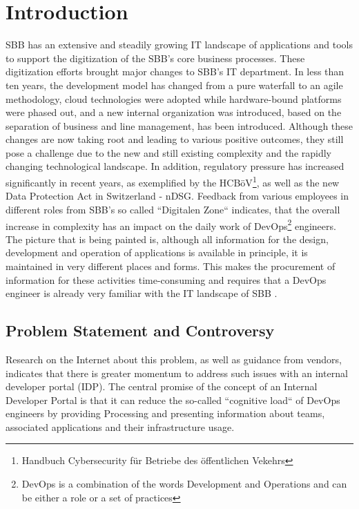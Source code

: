 \documentclass[a4paper,12pt]{article}
\begin{document}
    \section{Introduction}
    \label{sec:introduction}
    SBB has an extensive and steadily growing IT landscape of applications and tools to support the digitization of the
    SBB's core business processes.
    These digitization efforts brought major changes to SBB's IT department.
    In less than ten years, the development model has changed from a pure waterfall to an agile methodology,
    cloud technologies were adopted while hardware-bound platforms were phased out, and a new internal organization was introduced,
    based on the separation of business and line management, has been introduced.
    Although these changes are now taking root and leading to various positive outcomes, they still pose a challenge
    due to the new and still existing complexity and the rapidly changing technological landscape.
    In addition, regulatory pressure has increased significantly in recent years, as exemplified by the
    HCBöV\footnote{Handbuch Cybersecurity für Betriebe des öffentlichen Vekehrs}, as well as the new Data Protection Act
    in Switzerland - nDSG.\linebreak
    Feedback from various employees in different roles from SBB's so called ``Digitalen Zone`` indicates, that the overall
    increase in complexity has an impact on the daily work of DevOps\footnote{DevOps is a combination of the words
    Development and Operations and can be either a role or a set of practices} engineers.
    The picture that is being painted is, although all information for the design, development and operation of
    applications is available in principle, it is maintained in very different places and forms.
    This makes the procurement of information for these activities time-consuming and requires that a DevOps
    engineer is already very familiar with the IT landscape of SBB .

    \subsection{Problem Statement and Controversy}
    \label{subsec:iproblemstatement}
    Research on the Internet about this problem, as well as guidance from vendors, indicates that there is greater momentum
    to address such issues with an internal developer portal (IDP). The central promise of the concept of an
    Internal Developer Portal is that it can reduce the so-called ``cognitive load`` of DevOps engineers by providing
    Processing and presenting information about teams, associated applications and their infrastructure usage.
\end{document}
